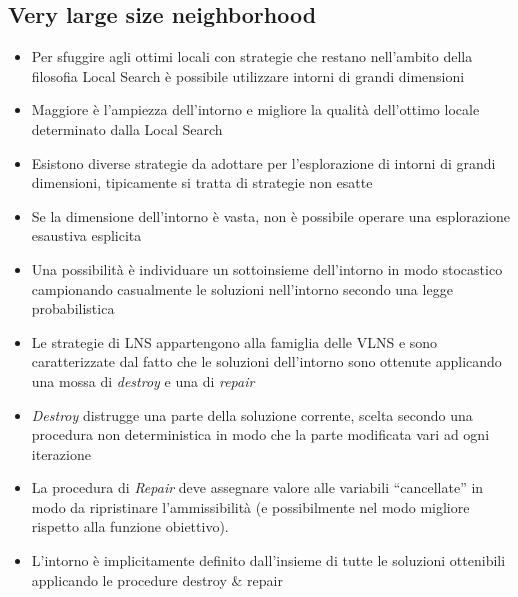 \documentclass[9pt]{beamer}
\begin{document}
\subsection{Very large size neighborhood}
\begin{frame}{\subsecname}

	\begin{itemize}
		\item
		Per sfuggire agli ottimi locali con strategie che restano nell’ambito della filosofia Local Search è possibile utilizzare intorni di grandi dimensioni

		\item
		Maggiore è l’ampiezza dell’intorno e migliore la qualità dell’ottimo locale determinato dalla Local Search

		\item
		Esistono diverse strategie da adottare per l’esplorazione di intorni di grandi dimensioni, tipicamente si tratta di strategie non esatte

		\item
		Se la dimensione dell’intorno è vasta, non è possibile operare una esplorazione esaustiva esplicita

		\item
		Una possibilità è individuare un sottoinsieme dell’intorno in modo stocastico campionando casualmente le soluzioni nell’intorno secondo una legge probabilistica
	\end{itemize}

\framebreak

	\begin{itemize}
		\item
		Le strategie di LNS appartengono alla famiglia delle VLNS e sono caratterizzate dal fatto che le soluzioni dell’intorno sono ottenute applicando una mossa di \emph{destroy} e una di \emph{repair}

		\item
		\emph{Destroy} distrugge una parte della soluzione corrente, scelta secondo una procedura non deterministica in modo che la parte modificata vari ad ogni iterazione

		\item
		La procedura di \emph{Repair} deve assegnare valore alle variabili “cancellate” in modo da ripristinare l’ammissibilità (e possibilmente nel modo migliore rispetto alla funzione obiettivo).

		\item
		L’intorno è implicitamente definito dall’insieme di tutte le soluzioni ottenibili applicando le procedure destroy \& repair


\end{itemize}
\end{frame}
\end{document}
